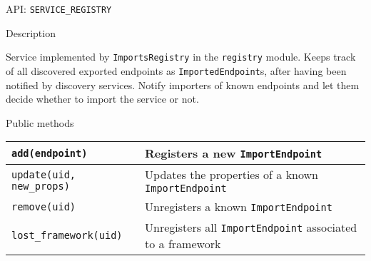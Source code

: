 \begin{frame}{API: \texttt{SERVICE\_REGISTRY}}
\begin{block}{Description}
\begin{small}
Service implemented by \texttt{ImportsRegistry} in the \texttt{registry} module.
Keeps track of all discovered exported endpoints as \texttt{ImportedEndpoint}s, after having been notified by discovery services.
Notify importers of known endpoints and let them decide whether to import the service or not.
\end{small}
\end{block}

\begin{block}{Public methods}
\begin{small}
\begin{tabular}{lp{}}
\texttt{add(endpoint)} & Registers a new \texttt{ImportEndpoint} \\
\hline
\texttt{update(uid, new\_props)} & Updates the properties of a known \texttt{ImportEndpoint}\\
\hline
\texttt{remove(uid)} & Unregisters a known \texttt{ImportEndpoint}\\
\hline
\texttt{lost\_framework(uid)} & Unregisters all \texttt{ImportEndpoint} associated to a framework\\
\end{tabular}
\end{small}
\end{block}
\end{frame}
